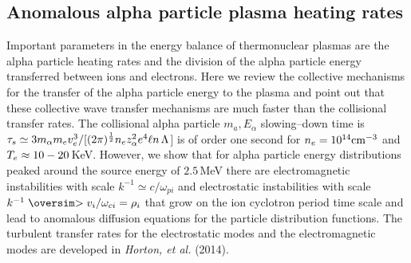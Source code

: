 \documentclass[a4paper,openany,12pt]{report}
\def\nms{\mathsurround=0pt}
\def\gtsim{\mathrel{\mathpalette\oversim>}} %
\def\oversim#1#2{\lower 2pt\vbox{\baselineskip 0pt \lineskip 1pt
    \ialign{$\nms#1\hfil##\hfil$\crcr#2\crcr\sim\crcr}}}
\begin{document}
\subsection{Anomalous alpha particle plasma heating rates}

Important parameters in the energy balance of thermonuclear plasmas are the alpha particle heating rates and the division of the alpha particle energy transferred between ions and electrons. Here we review the collective mechanisms for the transfer of the alpha particle energy to the plasma and point out that these collective wave transfer mechanisms are much faster than the collisional transfer rates. The collisional alpha particle $m_a, E_\alpha$ slowing--down time is $\tau_s\simeq 3 m_\alpha m_e v^3_e/[(2\pi)^{1\over 2} n_e z^2_\alpha e^4\ell n\, \Lambda$] is of order one second for $n_e = 10^{14}\rm cm^{-3}$ and $T_e\approx \rm 10-20\,$KeV. However, we show that for alpha particle energy distributions peaked around the source energy of $2.5\,$MeV there are electromagnetic instabilities with scale $k^{-1}\simeq c/\omega_{pi}$ and electrostatic instabilities with scale $k^{-1}\gtsim v_i/\omega_{ci}=\rho_i$ that grow on the ion cyclotron period time scale and lead to anomalous diffusion equations for the particle distribution functions. The turbulent transfer rates for the electrostatic modes and the electromagnetic modes are developed in \emph{Horton, et al.} (2014).
\end{document}
